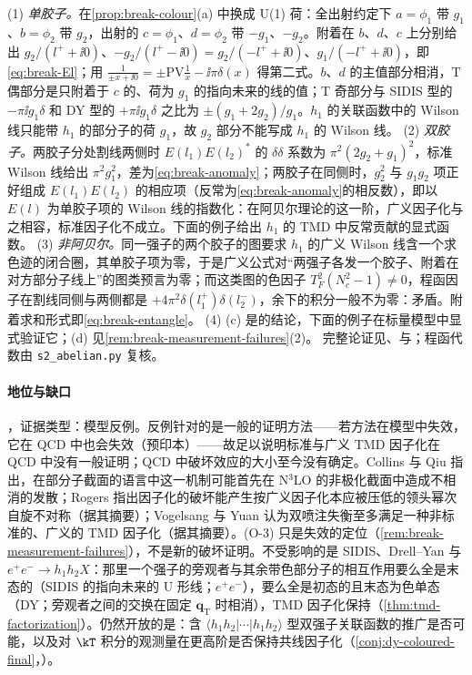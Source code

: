 \begin{proofsketch}
(1) \emph{单胶子。}在\cref{prop:break-colour}(a) 中换成 U(1) 荷：全出射约定下 $a=\phi_1$ 带 $g_1$、$b=\phi_2$ 带 $g_2$，出射的 $c=\phi_1$、$d=\phi_2$ 带 $-g_1$、$-g_2$。附着在 $b$、$d$、$c$ 上分别给出 $g_2/(l^++\ii0)$、$-g_2/(l^+-\ii0)=g_2/(-l^++\ii0)$、$g_1/(-l^++\ii0)$，即\cref{eq:break-El}；用 $\frac1{\pm x+\ii0}=\pm\mathrm{PV}\frac1x-\ii\pi\delta(x)$ 得第二式。$b$、$d$ 的主值部分相消，T 偶部分是只附着于 $c$ 的、荷为 $g_1$ 的指向未来的线的值；T 奇部分与 SIDIS 型的 $-\pi\ii g_1\delta$ 和 DY 型的 $+\pi\ii g_1\delta$ 之比为 $\pm(g_1+2g_2)/g_1$。$h_1$ 的关联函数中的 Wilson 线只能带 $h_1$ 的部分子的荷 $g_1$，故 $g_2$ 部分不能写成 $h_1$ 的 Wilson 线\cite{CollinsQiu2007}。
(2) \emph{双胶子。}两胶子分处割线两侧时 $E(l_1)E(l_2)^*$ 的 $\delta\delta$ 系数为 $\pi^2(2g_2+g_1)^2$，标准 Wilson 线给出 $\pi^2g_1^2$，差为\cref{eq:break-anomaly}；两胶子在同侧时，$g_2^2$ 与 $g_1g_2$ 项正好组成 $E(l_1)E(l_2)$ 的相应项（反常为\cref{eq:break-anomaly}的相反数），即以 $E(l)$ 为单胶子项的 Wilson 线的指数化\cite[式~(7)(8)]{Collins2007}：在阿贝尔理论的这一阶，广义因子化与之相容，标准因子化不成立。下面的例子给出 $h_1$ 的 TMD 中反常贡献的显式函数。
(3) \emph{非阿贝尔。}同一强子的两个胶子的图要求 $h_1$ 的广义 Wilson 线含一个求色迹的闭合圈，其单胶子项为零\cite[式~(30)(33)]{RogersMulders2010}，于是广义公式对“两强子各发一个胶子、附着在对方部分子线上”的图类预言为零；而这类图的色因子 $T_F^2(N_c^2-1)\neq0$，程函因子在割线同侧与两侧都是 $+4\pi^2\delta(l_1^+)\delta(l_2^-)$\cite[式~(34)--(36)]{RogersMulders2010}，余下的积分一般不为零：矛盾。附着求和形式即\cref{eq:break-entangle}。
(4) (c) 是\cite{Collins2007}的结论，下面的例子在标量模型中显式验证它；(d) 见\cref{rem:break-measurement-failures}(2)。
完整论证见\cite[第~IV~节]{CollinsQiu2007}、\cite{Collins2007}与\cite[第~V、VI~节]{RogersMulders2010}；程函代数由 \texttt{s2\_abelian.py} 复核。
\end{proofsketch}

\paragraph{地位与缺口}\tagV，证据类型：模型反例。反例针对的是一般的证明方法——若方法在模型中失效，它在 QCD 中也会失效\cite{Collins2007}（预印本）——故足以说明标准与广义 TMD 因子化在 QCD 中没有一般证明；QCD 中破坏效应的大小至今没有确定。Collins 与 Qiu 指出，在部分子截面的语言中这一机制可能首先在 N$^3$LO 的非极化截面中造成不相消的发散\cite{CollinsQiu2007}；Rogers 指出因子化的破坏能产生按广义因子化本应被压低的领头幂次自旋不对称\cite{Rogers:2013zha}（据其摘要）；Vogelsang 与 Yuan 认为双喷注失衡至多满足一种非标准的、广义的 TMD 因子化\cite{Vogelsang:2007jk}（据其摘要）。(O-3) 只是失效的定位（\cref{rem:break-measurement-failures}），不是新的破坏证明。不受影响的是 SIDIS、Drell--Yan 与 $e^+e^-\to h_1h_2X$：那里一个强子的旁观者与其余带色部分子的相互作用要么全是末态的（SIDIS 的指向未来的 U 形线；$e^+e^-$），要么全是初态的且末态为色单态（DY；旁观者之间的交换在固定 $\boldsymbol q_{\mathrm T}$ 时相消），TMD 因子化保持\tagA（\cref{thm:tmd-factorization}）。仍然开放的是：含 $\langle h_1h_2|\cdots|h_1h_2\rangle$ 型双强子关联函数的推广是否可能，以及对 $\kT$ 积分的观测量在更高阶是否保持共线因子化（\cref{conj:dy-coloured-final}，\tagC）。

